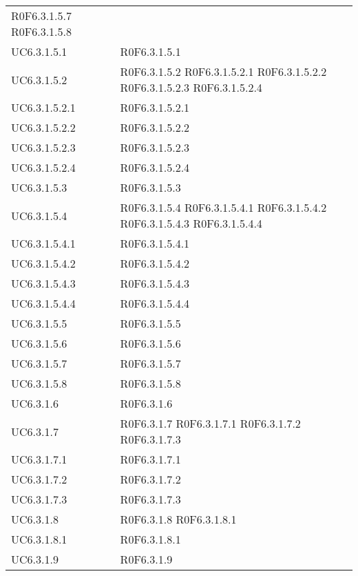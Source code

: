 \begin{longtable}{p{2.5cm}!{\VRule[1pt]}p{5.5cm}}
	\newline R0F6.3.1.5.7
	\newline R0F6.3.1.5.8\\
UC6.3.1.5.1 & R0F6.3.1.5.1\\
UC6.3.1.5.2 & R0F6.3.1.5.2
	\newline R0F6.3.1.5.2.1
	\newline R0F6.3.1.5.2.2
	\newline R0F6.3.1.5.2.3
	\newline R0F6.3.1.5.2.4\\
UC6.3.1.5.2.1 & R0F6.3.1.5.2.1\\
UC6.3.1.5.2.2 & R0F6.3.1.5.2.2\\
UC6.3.1.5.2.3 & R0F6.3.1.5.2.3\\
UC6.3.1.5.2.4 & R0F6.3.1.5.2.4\\
UC6.3.1.5.3 & R0F6.3.1.5.3\\
UC6.3.1.5.4 & R0F6.3.1.5.4
	\newline R0F6.3.1.5.4.1
	\newline R0F6.3.1.5.4.2
	\newline R0F6.3.1.5.4.3
	\newline R0F6.3.1.5.4.4\\
UC6.3.1.5.4.1 & R0F6.3.1.5.4.1\\
UC6.3.1.5.4.2 & R0F6.3.1.5.4.2\\
UC6.3.1.5.4.3 & R0F6.3.1.5.4.3\\
UC6.3.1.5.4.4 & R0F6.3.1.5.4.4\\
UC6.3.1.5.5 & R0F6.3.1.5.5\\
UC6.3.1.5.6 & R0F6.3.1.5.6\\
UC6.3.1.5.7 & R0F6.3.1.5.7\\
UC6.3.1.5.8 & R0F6.3.1.5.8\\
UC6.3.1.6 & R0F6.3.1.6\\
UC6.3.1.7 & R0F6.3.1.7
	\newline R0F6.3.1.7.1
	\newline R0F6.3.1.7.2
	\newline R0F6.3.1.7.3\\
UC6.3.1.7.1 & R0F6.3.1.7.1\\
UC6.3.1.7.2 & R0F6.3.1.7.2\\
UC6.3.1.7.3 & R0F6.3.1.7.3\\
UC6.3.1.8 & R0F6.3.1.8
	\newline R0F6.3.1.8.1\\
UC6.3.1.8.1 & R0F6.3.1.8.1\\
UC6.3.1.9 & R0F6.3.1.9\\

\end{longtable}
